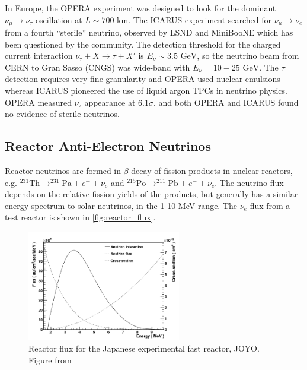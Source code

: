 In Europe, the OPERA\cite{opera} experiment was designed to look for the dominant $\nu_\mu \rightarrow \nu_\tau$ oscillation at $L\sim700\text{ km}$. The ICARUS\cite{icarus} experiment searched for $\nu_\mu\rightarrow\nu_e$ from a fourth ``sterile'' neutrino, observed by LSND\cite{lsnd} and MiniBooNE\cite{miniboone_sterile} which has been questioned by the community\cite{lsnd_refute}. The detection threshold for the charged current interaction $\nu_\tau + X \rightarrow \tau + X'$ is $E_\nu\sim 3.5\text{ GeV}$, so the neutrino beam from CERN to Gran Sasso (CNGS)\cite{cngs} was wide-band with $E_\nu = 10-25\text{ GeV}$. The $\tau$ detection requires very fine granularity and OPERA used nuclear emulsions whereas ICARUS pioneered the use of liquid argon TPCs in neutrino physics. OPERA measured $\nu_\tau$ appearance\cite{opera_final_tau} at 6.1$\sigma$, and both OPERA and ICARUS found no evidence of sterile neutrinos\cite{icarus_lsnd,opera_lsnd}.

\subsection{Reactor Anti-Electron Neutrinos}
Reactor neutrinos are formed in $\beta$ decay of fission products in nuclear reactors, e.g. $^{231}\text{Th} \rightarrow ^{231}\text{Pa} + e^- + \bar{\nu}_e$ and $^{215}\text{Po} \rightarrow ^{211}\text{Pb} + e^- + \bar{\nu}_e$. The neutrino flux depends on the relative fission yields of the products, but generally has a similar energy spectrum to solar neutrinos, in the 1-10 MeV range. The $\bar{\nu}_e$ flux from a test reactor is shown in \autoref{fig:reactor_flux}.
\begin{figure}[h]
	\includegraphics[width=0.6\textwidth, trim={0mm 0mm 0mm 0mm}, clip,page=1]{figures/theory/reactor_flux}
	\caption{Reactor flux for the Japanese experimental fast reactor, JOYO. Figure from \cite{reactor_flux}}
	\label{fig:reactor_flux}
\end{figure}

